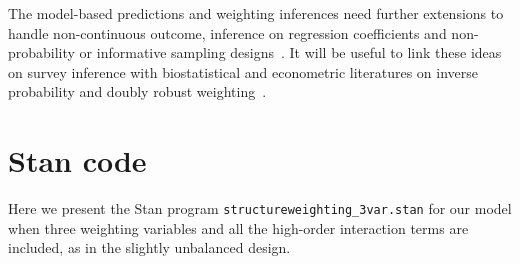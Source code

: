 \documentclass[11pt]{article}
\begin{document}
The model-based predictions and weighting inferences need further extensions to handle non-continuous outcome, inference on regression coefficients and non-probability or informative sampling designs~\citep{Kim:Skinner:BM13}. It will be useful to link these ideas on survey inference with biostatistical and econometric literatures on inverse probability and doubly robust weighting~\citep{kang:schafter07}.




\appendix

\section{Stan code}\label{stancode}
Here we present the Stan program {\tt structureweighting\_3var.stan} for our model when three weighting variables and all the high-order interaction terms are included, as in the slightly unbalanced design.
\end{document}
